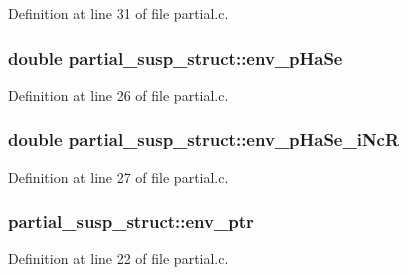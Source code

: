 Definition at line 31 of file partial.\+c.

\subsubsection[{\texorpdfstring{env\+\_\+p\+Ha\+Se}{env_pHaSe}}]{\setlength{\rightskip}{0pt plus 5cm}double partial\+\_\+susp\+\_\+struct\+::env\+\_\+p\+Ha\+Se}\hypertarget{structpartial__susp__struct_aaf189d80750cc56596f09fd7be1458e6}{}\label{structpartial__susp__struct_aaf189d80750cc56596f09fd7be1458e6}


Definition at line 26 of file partial.\+c.

\subsubsection[{\texorpdfstring{env\+\_\+p\+Ha\+Se\+\_\+i\+NcR}{env_pHaSe_iNcR}}]{\setlength{\rightskip}{0pt plus 5cm}double partial\+\_\+susp\+\_\+struct\+::env\+\_\+p\+Ha\+Se\+\_\+i\+NcR}\hypertarget{structpartial__susp__struct_a6ee7ecf18c92cb3b0556b240278d4519}{}\label{structpartial__susp__struct_a6ee7ecf18c92cb3b0556b240278d4519}


Definition at line 27 of file partial.\+c.

\subsubsection[{\texorpdfstring{env\+\_\+ptr}{env_ptr}}]{ partial\+\_\+susp\+\_\+struct\+::env\+\_\+ptr}\hypertarget{structpartial__susp__struct_a14af2a77a380e3497e43985d0f45850d}{}\label{structpartial__susp__struct_a14af2a77a380e3497e43985d0f45850d}


Definition at line 22 of file partial.\+c.

